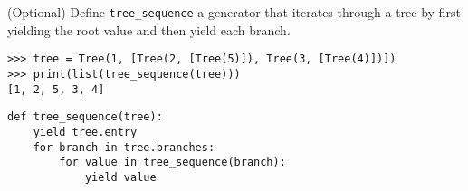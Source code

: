 \question (Optional) Define \texttt{tree\_sequence} a generator that iterates
through a tree by first yielding the root value and then yield each branch.

\begin{lstlisting}
>>> tree = Tree(1, [Tree(2, [Tree(5)]), Tree(3, [Tree(4)])])
>>> print(list(tree_sequence(tree)))
[1, 2, 5, 3, 4]
\end{lstlisting}

\begin{solution}[0.5in]
\begin{lstlisting}
def tree_sequence(tree):
	yield tree.entry
	for branch in tree.branches:
		for value in tree_sequence(branch):
			yield value
\end{lstlisting}
\end{solution}
